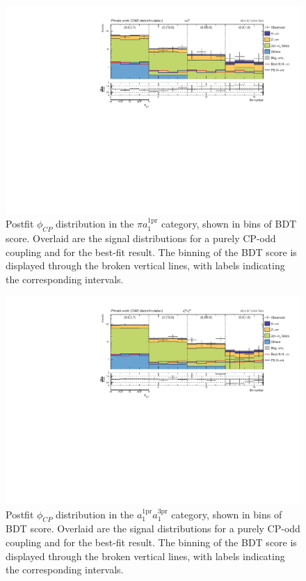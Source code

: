 \begin{figure}[!htbp]
    \centering
    \includegraphics[width=1\textwidth]{Figures/Chapter7/postfit/htt_tt_10_13p6TeV.pdf}
    \caption[Postfit $\phi_{CP}$ distribution in the $\pi a_1^\text{1pr}$ category.]
    {Postfit $\phi_{CP}$ distribution in the $\pi a_1^\text{1pr}$ category, shown in bins of \ac{BDT} score. Overlaid are the signal distributions for a purely CP-odd coupling and for the best-fit result. The binning of the BDT score is displayed through the broken vertical lines, with labels indicating the corresponding intervals.}
    \label{Figure:Chapter7_Postfit_Unrolled_8}
\end{figure}

\begin{figure}[!htbp]
    \centering
    \includegraphics[width=1\textwidth]{Figures/Chapter7/postfit/htt_tt_11_13p6TeV.pdf}
    \caption[Postfit $\phi_{CP}$ distribution in the $a_1^\text{1pr}a_1^\text{3pr}$ category.]
    {Postfit $\phi_{CP}$ distribution in the $a_1^\text{1pr}a_1^\text{3pr}$ category, shown in bins of \ac{BDT} score. Overlaid are the signal distributions for a purely CP-odd coupling and for the best-fit result. The binning of the BDT score is displayed through the broken vertical lines, with labels indicating the corresponding intervals.}
    \label{Figure:Chapter7_Postfit_Unrolled_9}
\end{figure}

